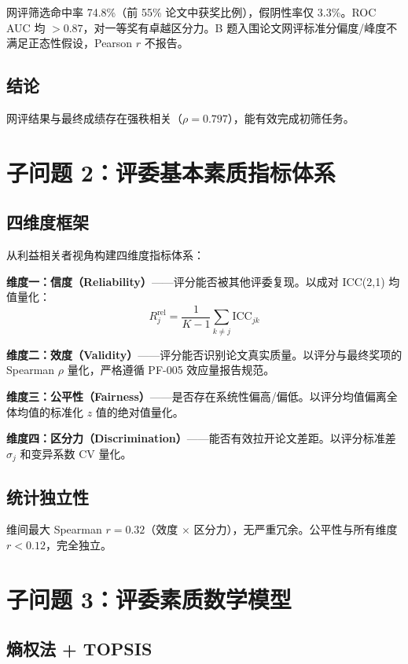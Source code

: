 \documentclass[UTF8]{ctexart}
\begin{document}
网评筛选命中率 74.8\%（前 55\% 论文中获奖比例），假阴性率仅 3.3\%。ROC AUC 均 $>0.87$，对一等奖有卓越区分力。B 题入围论文网评标准分偏度/峰度不满足正态性假设，Pearson $r$ 不报告。

\subsection{结论}

网评结果与最终成绩存在强秩相关（$\rho=0.797$），能有效完成初筛任务。

\section{子问题 2：评委基本素质指标体系}

\subsection{四维度框架}

从利益相关者视角构建四维度指标体系：

\textbf{维度一：信度（Reliability）}——评分能否被其他评委复现。以成对 ICC(2,1) 均值量化：
\begin{equation}
R_j^{\text{rel}} = \frac{1}{K-1} \sum_{k \neq j} \text{ICC}_{jk}
\end{equation}

\textbf{维度二：效度（Validity）}——评分能否识别论文真实质量。以评分与最终奖项的 Spearman $\rho$ 量化，严格遵循 PF-005 效应量报告规范。

\textbf{维度三：公平性（Fairness）}——是否存在系统性偏高/偏低。以评分均值偏离全体均值的标准化 $z$ 值的绝对值量化。

\textbf{维度四：区分力（Discrimination）}——能否有效拉开论文差距。以评分标准差 $\sigma_j$ 和变异系数 CV 量化。

\subsection{统计独立性}

维间最大 Spearman $r = 0.32$（效度 $\times$ 区分力），无严重冗余。公平性与所有维度 $r < 0.12$，完全独立。

\section{子问题 3：评委素质数学模型}

\subsection{熵权法 + TOPSIS}
\end{document}
